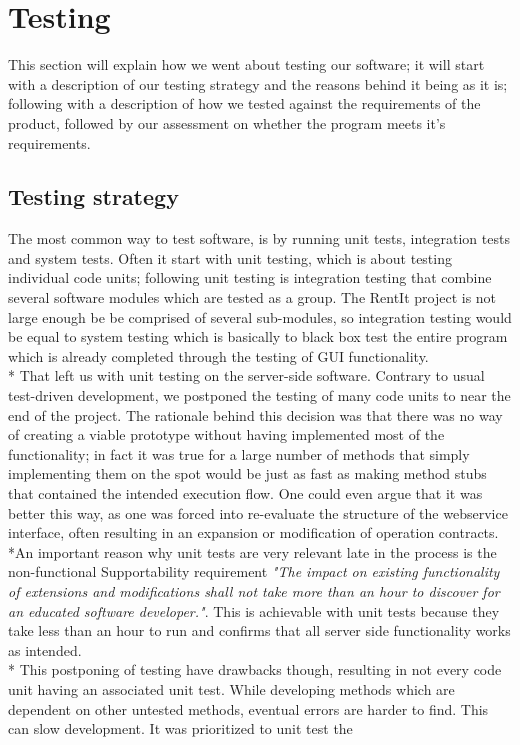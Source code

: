 \documentclass[a4paper,11pt,report]{article}
\begin{document}
\section{Testing}
This section will explain how we went about testing our software; it will start with a description of our testing strategy and the reasons behind it being
as it is; following with a description of how we tested against the requirements of the product, followed by our assessment on whether the program meets it's requirements.

\subsection{Testing strategy}
The most common way to test software, is by running unit tests, integration tests and system tests. Often it start with unit testing, which is about testing individual code units; following unit testing is integration testing that combine several software modules which are tested as a group. The RentIt project is not large enough be be comprised of
several sub-modules, so integration testing would be equal to system testing which is basically to black box test the entire program which is already completed
through the testing of GUI functionality.
\\*
That left us with unit testing on the server-side software. Contrary to usual test-driven development, we postponed the testing of many code units to near
the end of the project. The rationale behind this decision was that there was no way of creating a viable prototype without having implemented most of the 
functionality; in fact it was true for a large number of methods that simply implementing them on the spot would be just as fast as making method stubs 
that contained the intended execution flow. One could even argue that it was better this way, as one was forced into re-evaluate the structure of the webservice
interface, often resulting in an expansion or modification of operation contracts. \\*An important reason why unit tests are very relevant late in the process is the non-functional Supportability requirement 
\textit{"The impact on existing functionality of extensions and modifications shall not take more than an hour to discover for an educated software developer."}.
This is achievable with unit tests because they take less than an hour to run and confirms that all server side functionality works as intended.
\\*
This postponing of testing have drawbacks though, resulting in not every code unit having an associated unit test. While developing methods which are dependent on other untested methods, eventual errors are harder to find. This can slow development. It was prioritized to unit test the
\end{document}
